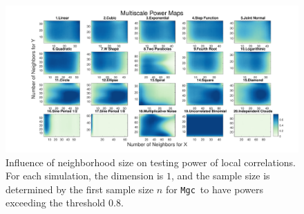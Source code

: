 \documentclass[11pt]{article}
\providecommand{\sct}[1]{{\sc \texttt{#1}}}
\providecommand{\mb}[1]{\boldsymbol{#1}}
\newcommand{\Mgc}{\sct{Mgc}}
\newcommand{\mbx}{\ensuremath{\mb{x}}}
\begin{document}
\begin{figure}[htbp]
\includegraphics[width=1.0\textwidth]{../Figures/Fig1DHeat}
\caption{Influence of neighborhood size on testing power of local correlations. For each simulation, the dimension is $1$, and the sample size is determined by the first sample size $n$ for \Mgc~to have powers exceeding the threshold $0.8$.
}
\label{f:powermaps1}
\end{figure}


\end{document}
